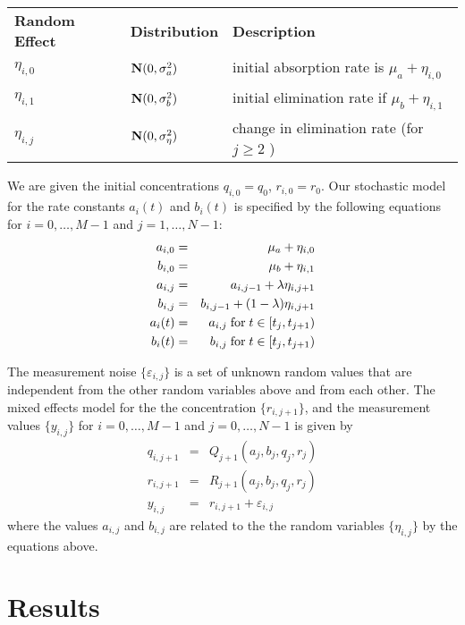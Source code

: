\documentclass{article}
\newcommand{\B}[1]{{\bf #1}}
\newcommand{\R}[1]{{\rm #1}}
\begin{document}
\bigskip
\begin{tabular}{lll}
{\bf Random Effect}  & {\bf Distribution} & {\bf Description}
\\
\( \eta_{i,0} \) &  \( \B{N} ( 0 , \sigma_a^2 ) \)    
& initial absorption rate is \( \mu_a + \eta_{i,0} \)
\\
\( \eta_{i,1} \) & \( \B{N} ( 0 , \sigma_b^2 ) \)    
& initial elimination rate if \( \mu_b + \eta_{i,1} \)
\\
\( \eta_{i,j} \) & \( \B{N} ( 0 , \sigma_\eta^2 ) \)    
& change in elimination rate (for \( j \geq 2 \) )
\end{tabular}

\bigskip
\noindent
We are given the initial concentrations 
\( q_{i,0} = q_0 \), \( r_{i,0} = r_0 \).
Our stochastic model for the rate constants \( a_i (t) \) and \( b_i (t) \)
is specified by the following equations for
\( i = 0 , \ldots , M-1 \) and \( j = 1 , \ldots , N-1 \):
\begin{eqnarray*}
a_{i,0} & = & \mu_a + \eta_{i,0} \\
b_{i,0} & = & \mu_b + \eta_{i,1} \\
a_{i,j} & = & a_{i, j-1} + \lambda \eta_{i, j+1} \\
b_{i,j} & = & b_{i, j-1} + (1 - \lambda ) \eta_{i, j+1} \\
a_i (t) & = & a_{i,j} \; \R{for} \; t \in [ t_j , t_{j+1} ) \\
b_i (t) & = & b_{i,j} \; \R{for} \; t \in [ t_j , t_{j+1} )
\end{eqnarray*}

\bigskip
\noindent
The measurement noise \( \{ \varepsilon_{i,j} \} \)
is a set of unknown random values 
that are independent from the other random variables above and
from each other.
The mixed effects model for the the concentration \( \{ r_{i, j+1} \} \),
and the measurement values \( \{ y_{i,j} \} \)
for \( i = 0 , \ldots , M-1 \)
and \( j = 0 , \ldots , N-1 \) is given by
\begin{eqnarray*}
q_{i, j+1} & = & Q_{j+1} ( a_j , b_j , q_j , r_j ) 
\\
r_{i, j+1} & = & R_{j+1} ( a_j , b_j , q_j , r_j ) 
\\
y_{i,j} & = & r_{i, j+1} + \varepsilon_{i,j}
\end{eqnarray*}
where the values \( a_{i,j} \) and \( b_{i,j} \) are related
to the the random variables  \( \{ \eta_{i,j} \} \) by the equations above.

\section{Results}
%
\end{document}
